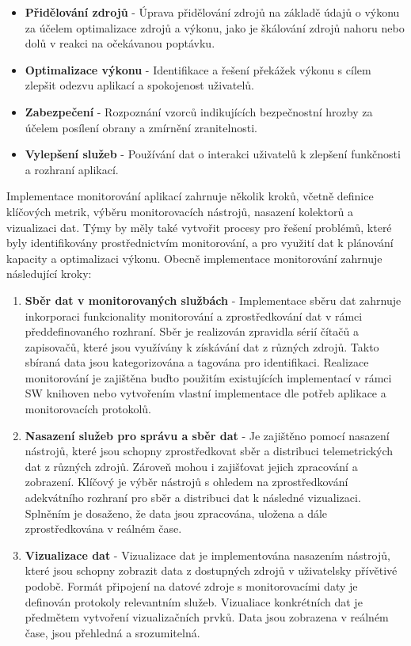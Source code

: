 \begin{itemize}
    \item \textbf{Přidělování zdrojů} - Úprava přidělování zdrojů na základě údajů o výkonu za účelem optimalizace zdrojů a výkonu, jako je škálování zdrojů nahoru nebo dolů v reakci na očekávanou poptávku.
    \item \textbf{Optimalizace výkonu} - Identifikace a řešení překážek výkonu s cílem zlepšit odezvu aplikací a spokojenost uživatelů.
    \item \textbf{Zabezpečení} - Rozpoznání vzorců indikujících bezpečnostní hrozby za účelem posílení obrany a zmírnění zranitelnosti.
    \item \textbf{Vylepšení služeb} - Používání dat o interakci uživatelů k zlepšení funkčnosti a rozhraní aplikací.
\end{itemize}


Implementace monitorování aplikací zahrnuje několik kroků, včetně definice klíčových metrik, výběru monitorovacích nástrojů, nasazení kolektorů a vizualizaci dat. Týmy by měly také vytvořit procesy pro řešení problémů, které byly identifikovány prostřednictvím monitorování, a pro využití dat k plánování kapacity a optimalizaci výkonu. Obecně implementace monitorování zahrnuje následující kroky:

\begin{enumerate}
    \item \textbf{Sběr dat v monitorovaných službách} - Implementace sběru dat zahrnuje inkorporaci funkcionality monitorování a zprostředkování dat v rámci předdefinovaného rozhraní. Sběr je realizován zpravidla sérií čítačů a zapisovačů, které jsou využívány k získávání dat z různých zdrojů. Takto sbíraná data jsou kategorizována a tagována pro identifikaci. Realizace monitorování je zajištěna buďto použitím existujících implementací v rámci SW knihoven nebo vytvořením vlastní implementace dle potřeb aplikace a monitorovacích protokolů.
    \item \textbf{Nasazení služeb pro správu a sběr dat} - Je zajištěno pomocí nasazení nástrojů, které jsou schopny zprostředkovat sběr a distribuci telemetrických dat z různých zdrojů. Zároveň mohou i zajišťovat jejich zpracování a zobrazení. Klíčový je výběr nástrojů s ohledem na zprostředkování adekvátního rozhraní pro sběr a distribuci dat k následné vizualizaci. Splněním je dosaženo, že data jsou zpracována, uložena a dále zprostředkována v reálném čase.
    \item \textbf{Vizualizace dat} - Vizualizace dat je implementována nasazením nástrojů, které jsou schopny zobrazit data z dostupných zdrojů v uživatelsky přívětivé podobě. Formát připojení na datové zdroje s monitorovacími daty je definován protokoly relevantním služeb. Vizualiace konkrétních dat je předmětem vytvoření vizualizačních prvků. Data jsou zobrazena v reálném čase, jsou přehledná a srozumitelná.
\end{enumerate}

